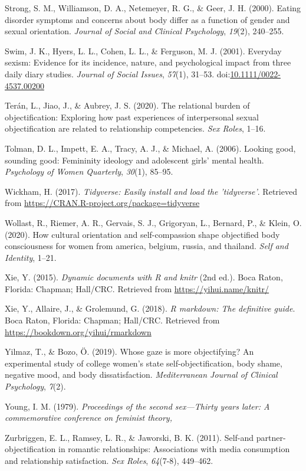 \documentclass[man]{apa6}
\begin{document}
\hypertarget{ref-strong2000eating}{}
Strong, S. M., Williamson, D. A., Netemeyer, R. G., \& Geer, J. H.
(2000). Eating disorder symptoms and concerns about body differ as a
function of gender and sexual orientation. \emph{Journal of Social and
Clinical Psychology}, \emph{19}(2), 240--255.

\hypertarget{ref-swimetal}{}
Swim, J. K., Hyers, L. L., Cohen, L. L., \& Ferguson, M. J. (2001).
Everyday sexism: Evidence for its incidence, nature, and psychological
impact from three daily diary studies. \emph{Journal of Social Issues},
\emph{57}(1), 31--53.
doi:\href{https://doi.org/10.1111/0022-4537.00200}{10.1111/0022-4537.00200}

\hypertarget{ref-teran2020relational}{}
Terán, L., Jiao, J., \& Aubrey, J. S. (2020). The relational burden of
objectification: Exploring how past experiences of interpersonal sexual
objectification are related to relationship competencies. \emph{Sex
Roles}, 1--16.

\hypertarget{ref-tolman2006looking}{}
Tolman, D. L., Impett, E. A., Tracy, A. J., \& Michael, A. (2006).
Looking good, sounding good: Femininity ideology and adolescent girls'
mental health. \emph{Psychology of Women Quarterly}, \emph{30}(1),
85--95.

\hypertarget{ref-R-tidyverse}{}
Wickham, H. (2017). \emph{Tidyverse: Easily install and load the
'tidyverse'}. Retrieved from
\url{https://CRAN.R-project.org/package=tidyverse}

\hypertarget{ref-wollast2020cultural}{}
Wollast, R., Riemer, A. R., Gervais, S. J., Grigoryan, L., Bernard, P.,
\& Klein, O. (2020). How cultural orientation and self-compassion shape
objectified body consciousness for women from america, belgium, russia,
and thailand. \emph{Self and Identity}, 1--21.

\hypertarget{ref-R-knitr}{}
Xie, Y. (2015). \emph{Dynamic documents with R and knitr} (2nd ed.).
Boca Raton, Florida: Chapman; Hall/CRC. Retrieved from
\url{https://yihui.name/knitr/}

\hypertarget{ref-R-rmarkdown}{}
Xie, Y., Allaire, J., \& Grolemund, G. (2018). \emph{R markdown: The
definitive guide}. Boca Raton, Florida: Chapman; Hall/CRC. Retrieved
from \url{https://bookdown.org/yihui/rmarkdown}

\hypertarget{ref-yilmaz2019whose}{}
Yilmaz, T., \& Bozo, Ö. (2019). Whose gaze is more objectifying? An
experimental study of college women's state self-objectification, body
shame, negative mood, and body dissatisfaction. \emph{Mediterranean
Journal of Clinical Psychology}, \emph{7}(2).

\hypertarget{ref-young1979}{}
Young, I. M. (1979). \emph{Proceedings of the second sex---Thirty years
later: A commemorative conference on feminist theory,}

\hypertarget{ref-zurbriggen2011self}{}
Zurbriggen, E. L., Ramsey, L. R., \& Jaworski, B. K. (2011). Self-and
partner-objectification in romantic relationships: Associations with
media consumption and relationship satisfaction. \emph{Sex Roles},
\emph{64}(7-8), 449--462.

\endgroup
\end{document}

